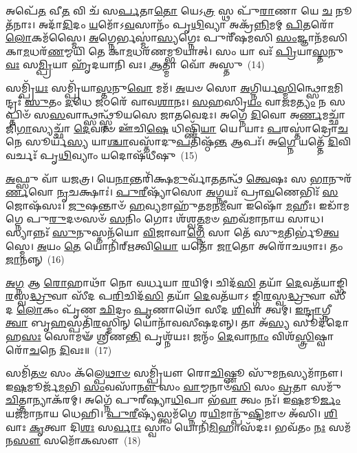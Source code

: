 𑌅𑌪𑍇᳴\-\ul{𑌤} 𑌵𑍀\-\ul{𑌤} 𑌵𑌿 𑌚᳴ 𑌸\-\ul{𑌰𑍍𑌪}\-𑌤𑌾\-\ul{𑌤𑍋} 𑌯𑍇\-𑌽\-\ul{𑌤𑍍𑌰} 𑌸𑍍𑌥 𑌪𑍁᳴\-\ul{𑌰𑌾}\-𑌣𑌾 𑌯𑍇 \ul{𑌚} 𑌨𑍂𑌤᳴𑌨𑌾𑌃। 𑌅𑌦𑌾᳴\-\ul{𑌦𑌿}\-𑌦𑌂 \ul{𑌯}\-𑌮𑍋᳴\-𑌽\-\ul{𑌵}\-𑌸𑌾𑌨𑌂᳴ 𑌪𑍃\-\ul{𑌥𑌿}\-𑌵𑍍𑌯𑌾 𑌅𑌕𑍍𑌰᳴\-\ul{𑌨𑍍𑌨𑌿}\-𑌮𑌮𑍍 \ul{𑌪𑌿}\-𑌤𑌰𑍋᳴ \ul{𑌲𑍋}\-𑌕𑌮᳴𑌸𑍍𑌮𑍈। \ul{𑌅}\-𑌗𑍍𑌨𑍇𑌰𑍍𑌭𑌸𑍍𑌮𑌾॑\-\ul{𑌸𑍍𑌯}\-𑌗𑍍𑌨𑍇𑌃 𑌪𑍁𑌰𑍀᳴𑌷𑌮𑌸𑌿 \ul{𑌸𑌂}\-𑌜𑍍𑌞𑌾𑌨᳴𑌮𑌸𑌿 𑌕𑌾\-\ul{𑌮}\-𑌧𑌰᳴\-\ul{𑌣}\-𑌮𑍍𑌮𑌯𑌿᳴ 𑌤𑍇 𑌕𑌾\-\ul{𑌮}\-𑌧𑌰᳴𑌣𑌮𑍍𑌭𑍂𑌯𑌾𑌤𑍍। 𑌸𑌂 𑌯𑌾 𑌵𑌃᳴ \ul{𑌪𑍍𑌰𑌿}\-𑌯𑌾\-\ul{𑌸𑍍𑌤}\-𑌨𑍁\-\ul{𑌵𑌃} 𑌸\-\ul{𑌮𑍍𑌪𑍍𑌰𑌿}\-𑌯𑌾 𑌹𑍃᳴𑌦𑌯𑌾𑌨𑌿 𑌵𑌃। \ul{𑌆}\-𑌤𑍍𑌮𑌾 𑌵𑍋᳴ 𑌅𑌸𑍍𑌤𑍁~(14)

𑌸𑌮𑍍𑌪𑍍𑌰𑌿᳴\-\ul{𑌯𑌃} 𑌸𑌮𑍍𑌪𑍍𑌰𑌿᳴𑌯𑌾\-\ul{𑌸𑍍𑌤}\-𑌨𑍁\-\ul{𑌵𑍋} 𑌮𑌮᳴। \ul{𑌅}\-𑌯𑍞 𑌸𑍋 \ul{𑌅}\-𑌗𑍍𑌨𑌿𑌰𑍍𑌯\-\ul{𑌸𑍍𑌮𑌿}\-𑌨𑍍𑌥𑍍𑌸𑍋\-\ul{𑌮}\-𑌮𑌿𑌨𑍍𑌦𑍍𑌰𑌃᳴ \ul{𑌸𑍁}\-𑌤𑌂 \ul{𑌦}\-𑌧𑍇 \ul{𑌜}\-𑌠𑌰𑍇᳴ 𑌵𑌾𑌵\-\ul{𑌶𑌾}\-𑌨𑌃। \ul{𑌸}\-\-\ul{𑌹}\-𑌸𑍍𑌰𑌿\-\ul{𑌯𑌂} 𑌵𑌾\-\ul{𑌜}\-𑌮\-\ul{𑌤𑍍𑌯𑌂} 𑌨 𑌸𑌪𑍍𑌤𑌿𑍞᳴ 𑌸\-\ul{𑌸}\-𑌵𑌾𑌨𑍍𑌥𑍍𑌸𑌨𑍍𑌥𑍍𑌸𑍍𑌤𑍂᳴𑌯𑌸𑍇 𑌜𑌾𑌤𑌵𑍇𑌦𑌃। 𑌅𑌗𑍍𑌨𑍇᳴ \ul{𑌦𑌿}\-𑌵𑍋 𑌅\-\ul{𑌰𑍍𑌣}\-𑌮𑌚𑍍𑌛𑌾᳴ 𑌜𑌿\-\ul{𑌗𑌾}\-𑌸𑍍𑌯𑌚𑍍𑌛𑌾᳴ \ul{𑌦𑍇}\-𑌵𑌾𑍞 𑌊᳴𑌚𑌿\-\ul{𑌷𑍇} 𑌧𑌿𑌷𑍍𑌣𑌿᳴\-\ul{𑌯𑌾} 𑌯𑍇। 𑌯𑌾𑌃 \ul{𑌪}\-𑌰𑌸𑍍𑌤𑌾॑𑌦𑍍𑌰𑍋\-\ul{𑌚}\-𑌨𑍇 𑌸𑍂𑌰𑍍𑌯᳴\-\ul{𑌸𑍍𑌯} 𑌯𑌾\-\ul{𑌶𑍍𑌚𑌾}\-𑌵𑌸𑍍𑌤𑌾᳴𑌦𑍁\-\ul{𑌪}\-𑌤𑌿𑌷𑍍𑌠᳴\-\ul{𑌨𑍍𑌤} 𑌆𑌪𑌃᳴। 𑌅\-\ul{𑌗𑍍𑌨𑍇} 𑌯𑌤𑍍𑌤𑍇᳴ \ul{𑌦𑌿}\-𑌵𑌿 𑌵𑌰𑍍𑌚𑌃᳴ 𑌪𑍃\-\ul{𑌥𑌿}\-𑌵𑍍𑌯𑌾𑌂 𑌯𑌦𑍋𑌷᳴𑌧𑍀𑌷𑍁~(15)

\-\ul{𑌅}\-𑌫𑍍𑌸𑍁 𑌵𑌾᳴ 𑌯𑌜𑌤𑍍𑌰। 𑌯𑍇\-\ul{𑌨𑌾}\-𑌨𑍍𑌤𑌰𑌿᳴𑌕𑍍𑌷\-\ul{𑌮𑍁}\-𑌰𑍍𑌵𑌾᳴\-\ul{𑌤}\-𑌤𑌨𑍍𑌥᳴ \ul{𑌤𑍍𑌵𑍇}\-𑌷𑌃 𑌸 \ul{𑌭𑌾}\-𑌨𑍁𑌰᳴\-\ul{𑌰𑍍𑌣}\-𑌵𑍋 \ul{𑌨𑍃}\-𑌚𑌕𑍍𑌷𑌾𑌃॑। \ul{𑌪𑍁}\-\-\ul{𑌰𑍀}\-𑌷𑍍𑌯𑌾᳴𑌸𑍋 \ul{𑌅}\-𑌗𑍍𑌨𑌯𑌃᳴ 𑌪𑍍𑌰𑌾\-\ul{𑌵}\-𑌣𑍇𑌭𑌿𑌃᳴ \ul{𑌸}\-𑌜𑍋𑌷᳴𑌸𑌃। \ul{𑌜𑍁}\-𑌷𑌨𑍍𑌤𑌾𑍞᳴ \ul{𑌹}\-𑌵𑍍𑌯𑌮𑌾𑌹𑍁᳴𑌤𑌮𑌨\-\ul{𑌮𑍀}\-𑌵𑌾 𑌇𑌷𑍋᳴ \ul{𑌮}\-𑌹𑍀𑌃। 𑌇𑌡𑌾᳴𑌮𑌗𑍍𑌨𑍇 𑌪𑍁\-\ul{𑌰𑍁}\-𑌦𑍞𑌸𑍞᳴ \ul{𑌸}\-𑌨𑌿𑌂 𑌗𑍋𑌃 𑌶᳴𑌶𑍍𑌵\-\ul{𑌤𑍍𑌤}\-𑌮𑍞 𑌹𑌵᳴𑌮𑌾𑌨𑌾𑌯 𑌸𑌾𑌧। 𑌸𑍍𑌯𑌾𑌨𑍍𑌨𑌃᳴ \ul{𑌸𑍁}\-𑌨𑍁𑌸𑍍𑌤𑌨᳴𑌯𑍋 \ul{𑌵𑌿}\-𑌜𑌾𑌵𑌾\-\ul{𑌗𑍍𑌨𑍇} 𑌸𑌾 𑌤𑍇᳴ 𑌸𑍁\-\ul{𑌮}\-𑌤𑌿𑌰𑍍𑌭𑍂॑\-\ul{𑌤𑍍𑌵}\-𑌸𑍍𑌮𑍇। \ul{𑌅}\-𑌯𑌂 \ul{𑌤𑍇} 𑌯𑍋𑌨𑌿᳴𑌰𑍍\mbox{}\-\ul{𑌋}\-𑌤𑍍𑌵𑌿\-\ul{𑌯𑍋} 𑌯𑌤𑍋᳴ \ul{𑌜𑌾}\-𑌤𑍋 𑌅𑌰𑍋᳴𑌚𑌥𑌾𑌃। 𑌤𑌂 \ul{𑌜𑌾}\-𑌨𑌨𑍍𑌨𑍍~(16)

\-\ul{𑌅}\-\-\ul{𑌗𑍍𑌨} 𑌆 \ul{𑌰𑍋}\-𑌹𑌾𑌥𑌾᳴ 𑌨𑍋 𑌵𑌰𑍍𑌧𑌯𑌾 \ul{𑌰}\-𑌯𑌿𑌮𑍍। 𑌚𑌿𑌦᳴\-\ul{𑌸𑌿} 𑌤𑌯𑌾᳴ \ul{𑌦𑍇}\-𑌵𑌤᳴𑌯𑌾𑌙𑍍𑌗𑌿\-\ul{𑌰}\-𑌸𑍍𑌵\-\ul{𑌦𑍍𑌧𑍍𑌰𑍁}\-𑌵𑌾 𑌸𑍀᳴𑌦 𑌪\-\ul{𑌰𑌿}\-𑌚𑌿𑌦᳴\-\ul{𑌸𑌿} 𑌤𑌯𑌾᳴ \ul{𑌦𑍇}\-𑌵𑌤᳴𑌯𑌾\-𑌽 𑌙𑍍𑌗𑌿\-\ul{𑌰}\-𑌸𑍍𑌵\-\ul{𑌦𑍍𑌧𑍍𑌰𑍁}\-𑌵𑌾 𑌸𑍀᳴𑌦 \ul{𑌲𑍋}\-𑌕𑌂 𑌪𑍃᳴𑌣 \ul{𑌛𑌿}\-𑌦𑍍𑌰𑌂 \ul{𑌪𑍃}\-𑌣𑌾𑌥𑍋᳴ 𑌸𑍀𑌦 \ul{𑌶𑌿}\-𑌵𑌾 𑌤𑍍𑌵𑌮𑍍। \ul{𑌇}\-\-\ul{𑌨𑍍𑌦𑍍𑌰𑌾}\-𑌗𑍍𑌨𑍀 \ul{𑌤𑍍𑌵𑌾} 𑌬𑍃\-\ul{𑌹}\-𑌸𑍍𑌪𑌤𑌿᳴\-\ul{𑌰}\-𑌸𑍍𑌮𑌿𑌨𑍍 𑌯𑍋𑌨𑌾᳴𑌵𑌸𑍀𑌷𑌦𑌨𑍍𑌨𑍍। 𑌤𑌾 𑌅᳴\-\ul{𑌸𑍍𑌯} 𑌸𑍂𑌦᳴𑌦𑍋𑌹\-\ul{𑌸𑌃} 𑌸𑍋𑌮𑍟᳴ 𑌶𑍍𑌰𑍀𑌣\-\ul{𑌨𑍍𑌤𑌿} 𑌪𑍃𑌶𑍍𑌨᳴𑌯𑌃। 𑌜𑌨𑍍𑌮𑌂᳴ \ul{𑌦𑍇}\-𑌵𑌾\-\ul{𑌨𑌾𑌂} 𑌵𑌿𑌶᳴\-\ul{𑌸𑍍𑌤𑍍𑌰𑌿}\-𑌷𑍍𑌵𑌾 𑌰𑍋᳴\-\ul{𑌚}\-𑌨𑍇 \ul{𑌦𑌿}\-𑌵𑌃॥~(17)

{\anuvakamend[{\-\ul{𑌅}\-𑌸𑍍𑌤𑍍𑌵𑍋𑌷᳴𑌧𑍀𑌷𑍁 \ul{𑌜𑌾}\-𑌨\-\ul{𑌨𑍍𑌨}\-𑌷𑍍𑌟𑌾𑌚᳴𑌤𑍍𑌵𑌾𑌰𑌿𑍞𑌶𑌚𑍍𑌚}]}%

𑌸𑌮𑌿᳴\-\ul{𑌤}\-\-\ul{𑍞} 𑌸𑌂 𑌕᳴𑌲𑍍𑌪𑍇\-\ul{𑌥𑌾}\-\-\ul{𑍞} 𑌸𑌮𑍍𑌪𑍍𑌰𑌿᳴𑌯𑍗 𑌰𑍋\-\ul{𑌚𑌿}\-𑌷𑍍𑌣𑍂 𑌸𑍁᳴𑌮\-\ul{𑌨}\-𑌸𑍍𑌯𑌮𑌾᳴𑌨𑍗। 𑌇\-\ul{𑌷}\-𑌮𑍂𑌰𑍍𑌜᳴\-\ul{𑌮}\-𑌭𑌿 \ul{𑌸𑌂}\-𑌵𑌸𑌾᳴\-\ul{𑌨𑍗} 𑌸𑌂 \ul{𑌵𑌾}\-𑌮𑍍𑌮𑌨𑌾𑍞᳴\-\ul{𑌸𑌿} 𑌸𑌂 \ul{𑌵𑍍𑌰}\-𑌤𑌾 𑌸𑌮𑍁᳴ \ul{𑌚𑌿}\-𑌤𑍍𑌤𑌾𑌨𑍍𑌯𑌾𑌕᳴𑌰𑌮𑍍। 𑌅𑌗𑍍𑌨𑍇᳴ 𑌪𑍁𑌰𑍀𑌷𑍍𑌯𑌾\-\ul{𑌧𑌿}\-𑌪𑌾 𑌭᳴\-\ul{𑌵𑌾} 𑌤𑍍𑌵𑌂 𑌨𑌃᳴। 𑌇\-\ul{𑌷}\-𑌮𑍂\-\ul{𑌰𑍍𑌜𑌂} 𑌯𑌜᳴𑌮𑌾𑌨𑌾𑌯 𑌧𑍇𑌹𑌿। \ul{𑌪𑍁}\-\-\ul{𑌰𑍀}\-𑌷𑍍𑌯᳴𑌸𑍍𑌤𑍍𑌵𑌮᳴𑌗𑍍𑌨𑍇 𑌰\-\ul{𑌯𑌿}\-𑌮𑌾𑌨𑍍𑌪𑍁᳴\-\ul{𑌷𑍍𑌟𑌿}\-𑌮𑌾𑍞 𑌅᳴𑌸𑌿। \ul{𑌶𑌿}\-𑌵𑌾𑌃 \ul{𑌕𑍃}\-𑌤𑍍𑌵𑌾 𑌦𑌿\-\ul{𑌶𑌃} 𑌸\-\ul{𑌰𑍍𑌵𑌾𑌃} 𑌸𑍍𑌵𑌾𑌂 𑌯𑍋𑌨𑌿᳴\-\ul{𑌮𑌿}\-𑌹𑌾𑌸᳴𑌦𑌃। 𑌭𑌵᳴𑌤𑌂 \ul{𑌨𑌃} 𑌸𑌮᳴𑌨\-\ul{𑌸𑍗} 𑌸𑌮𑍋᳴𑌕𑌸𑍗~(18)


